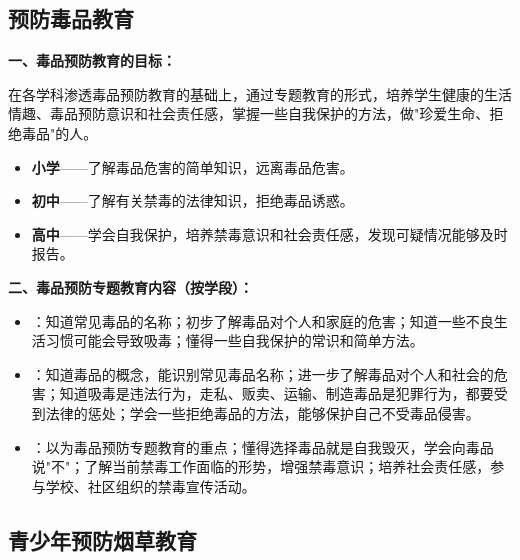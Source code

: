 \subsection{预防毒品教育}

\begin{keybox}
\textbf{一、毒品预防教育的目标：}

在各学科渗透毒品预防教育的基础上，通过专题教育的形式，培养学生健康的生活情趣、毒品预防意识和社会责任感，掌握一些自我保护的方法，做"珍爱生命、拒绝毒品"的人。

\begin{itemize}[leftmargin=*]
    \item \textbf{小学}——了解毒品危害的简单知识，远离毒品危害。
    \item \textbf{初中}——了解有关禁毒的法律知识，拒绝毒品诱惑。
    \item \textbf{高中}——学会自我保护，培养禁毒意识和社会责任感，发现可疑情况能够及时报告。
\end{itemize}

\textbf{二、毒品预防专题教育内容（按学段）：}

\begin{itemize}[leftmargin=*]
    \item {}：知道常见毒品的名称；初步了解毒品对个人和家庭的危害；知道一些不良生活习惯可能会导致吸毒；懂得一些自我保护的常识和简单方法。
    \item {}：知道毒品的概念，能识别常见毒品名称；进一步了解毒品对个人和社会的危害；知道吸毒是违法行为，走私、贩卖、运输、制造毒品是犯罪行为，都要受到法律的惩处；学会一些拒绝毒品的方法，能够保护自己不受毒品侵害。
    \item {}：以为毒品预防专题教育的重点；懂得选择毒品就是自我毁灭，学会向毒品说"不"；了解当前禁毒工作面临的形势，增强禁毒意识；培养社会责任感，参与学校、社区组织的禁毒宣传活动。
\end{itemize}
\end{keybox}

\subsection{青少年预防烟草教育}

